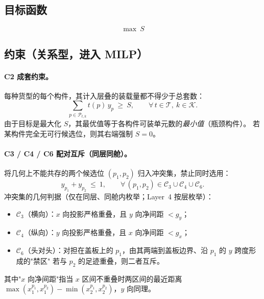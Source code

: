 \documentclass[11pt]{article}
\begin{document}
\subsection{目标函数}
\begin{equation}
\boxed{\ \max\ S\ }
\end{equation}

\subsection{约束（关系型，进入 MILP）}

\paragraph{C2 成套约束。}
每种货型的每个构件，其计入层叠的装载量都不得少于总套数：
\begin{equation}
\sum_{p\in\mathcal{P}_{t,k}} t(p)\, y_p \ \ge\ S,
\qquad \forall\, t\in\mathcal{T},\ k\in\mathcal{K}.
\label{eq:c2}
\end{equation}
由于目标是最大化 $S$，其最优值等于各构件可装单元数的\emph{最小值}（瓶颈构件）。
若某构件完全无可行候选位，则其右端强制 $S=0$。

\paragraph{C3 / C4 / C6 配对互斥（同层同舱）。}
将几何上不能共存的两个候选位 $(p_1,p_2)$ 归入冲突集，禁止同时选用：
\begin{equation}
y_{p_1} + y_{p_2} \ \le\ 1,
\qquad \forall\, (p_1,p_2)\in \mathcal{C}_3\cup\mathcal{C}_4\cup\mathcal{C}_6 .
\label{eq:c346}
\end{equation}
冲突集的几何判据（仅在同层、同舱内枚举；Layer~4 按层枚举）：
\begin{itemize}[leftmargin=1.8em,itemsep=2pt]
  \item $\mathcal{C}_3$（横向）：$x$ 向投影严格重叠，且 $y$ 向净间距 $<g_y$；
  \item $\mathcal{C}_4$（纵向）：$y$ 向投影严格重叠，且 $x$ 向净间距 $<g_x$；
  \item $\mathcal{C}_6$（头对头）：对担在盖板上的 $p_1$，由其两端到盖板边界、沿 $p_1$ 的 $y$ 跨度形成的"禁区"
  若与 $p_2$ 的足迹重叠，则二者互斥。
\end{itemize}
其中"$x$ 向净间距"指当 $x$ 区间不重叠时两区间的最近距离 $\max(x_1^{p_1},x_1^{p_2})-\min(x_2^{p_1},x_2^{p_2})$，$y$ 向同理。
\end{document}
